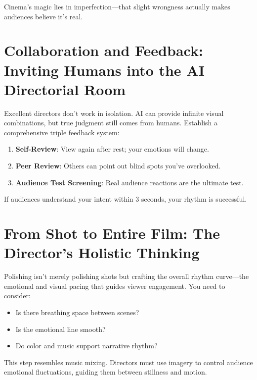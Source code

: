 Cinema's magic lies in imperfection—that slight wrongness actually makes audiences believe it's real.

\section{Collaboration and Feedback: Inviting Humans into the AI Directorial Room}
\label{sec:collaboration-feedback}

Excellent directors don't work in isolation. AI can provide infinite visual combinations, but true judgment still comes from humans. Establish a comprehensive triple feedback system:

\begin{enumerate}
\item \textbf{Self-Review}: View again after rest; your emotions will change.

\item \textbf{Peer Review}: Others can point out blind spots you've overlooked.

\item \textbf{Audience Test Screening}: Real audience reactions are the ultimate test.
\end{enumerate}

If audiences understand your intent within 3 seconds, your rhythm is successful.

\section{From Shot to Entire Film: The Director's Holistic Thinking}
\label{sec:holistic-thinking}

Polishing isn't merely polishing shots but crafting the overall rhythm curve—the emotional and visual pacing that guides viewer engagement. You need to consider:

\begin{itemize}
\item Is there breathing space between scenes?
\item Is the emotional line smooth?
\item Do color and music support narrative rhythm?
\end{itemize}

This step resembles music mixing. Directors must use imagery to control audience emotional fluctuations, guiding them between stillness and motion.

